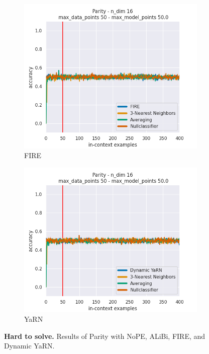 \documentclass[letterpaper]{article} %
\begin{document}
\begin{figure}[tp]
\begin{subfigure}[t]{0.24\linewidth}
    \end{subfigure}
    \begin{subfigure}[t]{0.24\linewidth}
        \includegraphics[width=\linewidth]{AnonymousSubmission/LaTeX/imgs/experiments/parity/fire.png}
        \caption{FIRE}
    \end{subfigure}
    \begin{subfigure}[t]{0.24\linewidth}
        \includegraphics[width=\linewidth]{AnonymousSubmission/LaTeX/imgs/experiments/parity/dynamic-yarn.png}
        \caption{YaRN}
    \end{subfigure}
    \caption{\small\textbf{Hard to solve.} Results of Parity with NoPE, ALiBi, FIRE, and Dynamic YaRN.}
    \label{fig:hard}
\end{figure}
\end{document}
